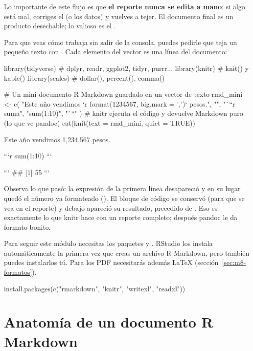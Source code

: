 Lo importante de este flujo es que \textbf{el reporte nunca se edita a mano}:
si algo está mal, corriges el  (o los datos) y vuelves a
tejer. El documento final es un producto desechable; lo valioso es el
.

Para que veas cómo trabaja  sin salir de la consola, puedes
pedirle que teja un pequeño texto con . Cada
elemento del vector es una línea del documento:

\begin{rcode}
library(tidyverse)   # dplyr, readr, ggplot2, tidyr, purrr...
library(knitr)       # knit() y kable()
library(scales)      # dollar(), percent(), comma()

# Un mini documento R Markdown guardado en un vector de texto
rmd_mini <- c(
  "Este año vendimos `r format(1234567, big.mark = ',')` pesos.",
  "",
  "```{r suma}",
  "sum(1:10)",
  "```"
)
# knitr ejecuta el código y devuelve Markdown puro (lo que ve pandoc)
cat(knit(text = rmd_mini, quiet = TRUE))
\end{rcode}
\begin{rsalida}
Este año vendimos 1,234,567 pesos.


```r
sum(1:10)
```

```
## [1] 55
```
\end{rsalida}

Observa lo que pasó: la expresión  de la primera
línea desapareció y en su lugar quedó el número ya formateado
(). El bloque de código se conservó (para que se vea en el
reporte) y debajo apareció su resultado, precedido de \codigo{\#\#}. Eso es
exactamente lo que knitr hace con un reporte completo; después pandoc le da
formato bonito.

\begin{consejo}
Para seguir este módulo necesitas los paquetes  y
. RStudio los instala automáticamente la primera vez que
creas un archivo R Markdown, pero también puedes instalarlos tú. Para los
PDF necesitarás además LaTeX (sección~\ref{sec:m8-formatos}).
\end{consejo}

\begin{rnoejecutar}
install.packages(c("rmarkdown", "knitr", "writexl", "readxl"))
\end{rnoejecutar}

\section{Anatomía de un documento R Markdown}
\label{sec:m8-anatomia}

